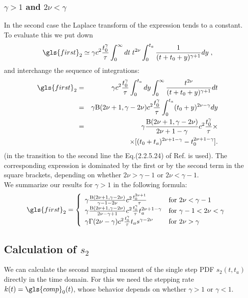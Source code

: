 \subsubsection{$\gamma>1$ and $2\nu < \gamma$}
In the second case the Laplace transform of the expression tends to a constant. To evaluate this we put down 
\begin{equation}
 \gls{first}_2 \simeq  \gamma c^2 \frac{t_0^\gamma}{\tau} \int_0^\infty dt \; t^{2\nu} \int_0^{t_a} \frac{1}{(t+t_0+y)^{\gamma+1}} dy \; ,
\end{equation}
and interchange the sequence of integrations:
\begin{eqnarray}
 \gls{first}_2 &=& \gamma c^2 \frac{ t_0^\gamma}{\tau} \int_0^{t_a} dy \int_0^\infty \frac{t^{2\nu}}{(t+t_0+y)^{\gamma+1}} dt \nonumber \\
 &=& \gamma \mathrm{B}(2\nu+1,\gamma - 2\nu) c^2 \frac{ t_0^\gamma}{\tau}  \int_0^{t_a} (t_0+y)^{2\nu -\gamma} dy \nonumber \\
 &=& \gamma  \frac{\mathrm{B}(2\nu+1,\gamma - 2\nu) }{2 \nu +1- \gamma } c^2 \frac{t_0^\gamma}{\tau} \times \\
 && \;\;\; \times [(t_0+t_a)^{2\nu +1- \gamma }-t_0^{2\nu+1 - \gamma }]. \nonumber
\end{eqnarray}
%
(in the transition to the second line the Eq.(2.2.5.24) of Ref. \cite{BryPr} is used). The corresponding expression is dominated by the first or by the second term in the square 
brackets, depending on whether $2\nu > \gamma -1$ or $2\nu < \gamma -1$. \\
We summarize our results for $\gamma > 1$ in the following formula:
\begin{equation}
 \gls{first}_2 = \left\{
 \begin{array}{ll}
   \gamma \frac{\mathrm{B}(2\nu+1,\gamma - 2\nu)}{ \gamma -1 - 2 \nu} c^2 \frac{  t_0^{2\nu +1}}{\tau}  & \mbox{for } 2\nu < \gamma -1 \\
  \gamma \frac{\mathrm{B}(2\nu+1,\gamma - 2\nu)}{2 \nu - \gamma +1} c^2 \frac{ t_0^\gamma}{\tau} t_a^{2\nu +1- \gamma }  & \mbox{for } \gamma-1 < 2\nu < \gamma \\ 
 \gamma \Gamma(2\nu-\gamma) c^2 \frac{t_0^\gamma}{\tau} t_a s^{\gamma - 2\nu} & \mbox{for } 2\nu > \gamma 
 \end{array}
 \right.
\end{equation}


\subsection{Calculation of $s_2$}
We can calculate the second marginal moment of the single step PDF $s_{2}(t,t_a)$ directly in the time domain. For this we need the stepping rate $k(t)=\gls{comp}_0(t)$, whose behavior depends on whether $\gamma>1$ or $\gamma<1$.

